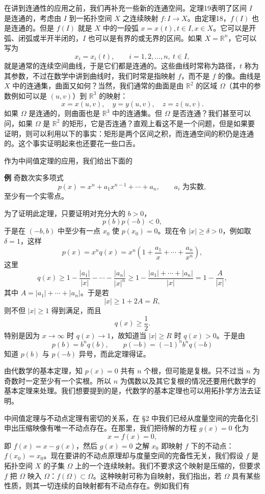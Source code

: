 在讲到连通性的应用之前，我们再补充一些新的连通空间。定理19表明了区间 $I$ 是连通的，考虑由 $I$ 到一拓扑空间 $X$ 之连续映射 $f:I\to X$。由定理18，$f(I)$ 也是连通的。但是 $f(I)$ 就是 $X$ 中的一段弧 $x=x(t),t\in I,x\in X$。它可以是开弧、闭弧或半开半闭的，$I$ 也可以是有界的或无界的区间。如果 $X=\mathbb R^n$，它可以写为
\[
 x_i=x_i(t),\qquad i=1,2,\ldots,n,\ t\in I,
\]
就是通常的连续空间曲线，于是它们都是连通的。这些曲线时常称为路径，$t$ 称为其参数，不过在数学中讲到曲线时，我们时常是指映射 $f$，而不是 $f$ 的像。曲线是 $X$ 中的连通集，曲面又如何？当然，我们通常的曲面是由 $\mathbb R^2$ 的区域 $\Omega$（其中的参数例如可以是 $(u,v)$）到 $\mathbb R^3$ 的映射：
\[
 x=x(u,v),\quad y=y(u,v),\quad z=z(u,v).
\]
如果 $\Omega$ 是连通的，则曲面也是 $\mathbb R^3$ 中的连通集。但 $\Omega$ 是否连通？我们甚至可以问，如果 $\Omega$ 是 $\mathbb R^2$ 的矩形，它是否连通？直观上看这不是一个问题，但是如果要证明，则可以利用以下的事实：矩形是两个区间之积，而连通空间的积仍是连通的。这个事实证明起来也还要花一些口舌。

作为中间值定理的应用，我们给出下面的

\noindent\textbf{例}\quad
奇数次实多项式
\[
 p(x)=x^n+a_1x^{n-1}+\cdots+a_n,\qquad a_i\text{ 为实数},
\]
至少有一个实零点。

为了证明此定理，只要证明对充分大的 $b>0$，
\[
 p(b)p(-b)<0,
\]
于是在 $(-b,b)$ 中至少有一点 $x_0$ 使 $p(x_0)=0$。现在令 $|x|\ge\delta>0$，例如取 $\delta=1$，这样
\[
 p(x)=x^nq(x)=x^n\left(1+\frac{a_1}{x}+\cdots+\frac{a_n}{x^n}\right),
\]
这里
\[
 q(x)\ge1-\frac{|a_1|}{|x|}-\cdots-\frac{|a_n|}{|x|^n}
 \ge1-\frac{|a_1|+\cdots+|a_n|}{|x|}=1-\frac{A}{|x|},
\]
其中 $A=|a_1|+\cdots+|a_n|$。于是若
\[
 |x|\ge1+2A=R,
\]
则不但 $|x|\ge1$ 得到满足，而且
\[
 q(x)\ge\frac12.
\]
特别是因为 $x\to\infty$ 时 $q(x)\to1$，故知道当 $|x|\ge R$ 时 $q(x)>0$。于是由
\[
 p(b)=b^nq(b),\qquad p(-b)=(-1)^nb^nq(-b)
\]
知道 $p(b)$ 与 $p(-b)$ 异号，而此定理得证。

由代数学的基本定理，知 $p(x)=0$ 共有 $n$ 个根，但可能是复根。只不过当 $n$ 为奇数时一定至少有一个实根。所以 $n$ 为偶数以及其它复根的情况还要用代数学的基本定理来处理。我们想要提到的是，代数学的基本定理也可以用拓扑学方法去证明。

中间值定理与不动点定理有密切的关系，在 \S2 中我们已经从度量空间的完备化引申出压缩映像有唯一不动点存在。在那里，我们把待解的方程 $g(x)=0$ 化为
\[
 x=f(x)=0,
\]
即 $f(x)=x-g(x)$，然后 $g(x)=0$ 之解 $x_0$ 即映射 $f$ 下的不动点：$f(x_0)=x_0$。现在要讲的不动点原理却与度量空间的完备性无关，我们假设 $f$ 是拓扑空间 $X$ 的子集 $\Omega$ 上的一个连续映射。我们不要求这个映射是压缩的，但要求 $f$ 把 $\Omega$ 映入 $\Omega$：$f(\Omega)\subset\Omega$。这种映射可称为自映射，我们指出，若 $\Omega$ 具有某些性质，则其一切连续的自映射都有不动点存在。例如我们有


